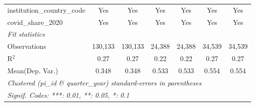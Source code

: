 \begin{tabular}{lcccccc}
   institution\_country\_code                                  & Yes            & Yes            & Yes           & Yes           & Yes           & Yes\\  
   covid\_share\_2020                                          & Yes            & Yes            & Yes           & Yes           & Yes           & Yes\\  
   \midrule
   \emph{Fit statistics}\\
   Observations                                                & 130,133        & 130,133        & 24,388        & 24,388        & 34,539        & 34,539\\  
   R$^2$                                                       & 0.27           & 0.27           & 0.22          & 0.22          & 0.27          & 0.27\\  
Mean(Dep. Var.) & 0.348 & 0.348 & 0.533 & 0.533 & 0.554 & 0.554 \\
   \midrule \midrule
   \multicolumn{7}{l}{\emph{Clustered (pi\_id \& quarter\_year) standard-errors in parentheses}}\\
   \multicolumn{7}{l}{\emph{Signif. Codes: ***: 0.01, **: 0.05, *: 0.1}}\\
\end{tabular}
\par\endgroup
